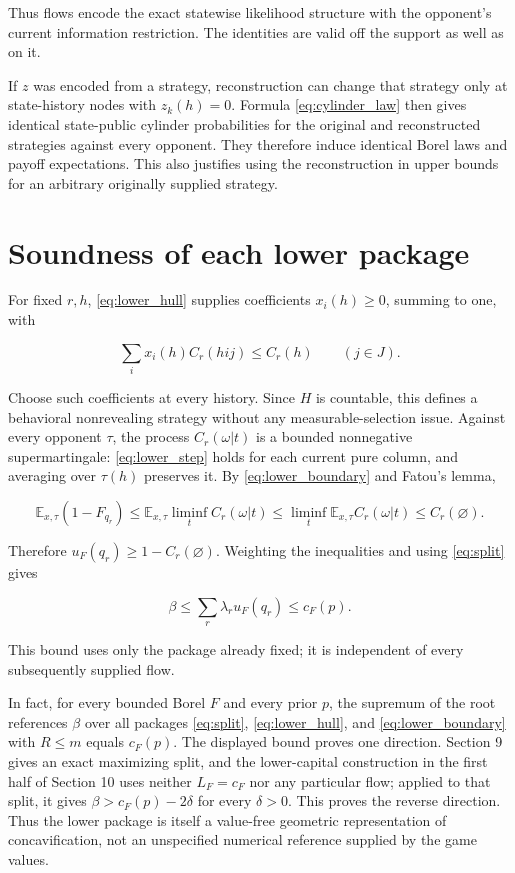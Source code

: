 \documentclass[11pt,a4paper]{article}
\begin{document}
Thus flows encode the exact statewise likelihood structure with the opponent's current information restriction. The identities are valid off the support as well as on it.

If \(z\) was encoded from a strategy, reconstruction can change that strategy only at state-history nodes with \(z_k(h)=0\). Formula \eqref{eq:cylinder_law} then gives identical state-public cylinder probabilities for the original and reconstructed strategies against every opponent. They therefore induce identical Borel laws and payoff expectations. This also justifies using the reconstruction in upper bounds for an arbitrary originally supplied strategy.

\section{Soundness of each lower package}

For fixed \(r,h\), \eqref{eq:lower_hull} supplies coefficients \(x_i(h)\ge0\), summing to one, with

\begin{equation}
\sum_i x_i(h)C_r(hij)\le C_r(h)\qquad(j\in J). \label{eq:lower_step}
\end{equation}

Choose such coefficients at every history. Since \(H\) is countable, this defines a behavioral nonrevealing strategy without any measurable-selection issue. Against every opponent \(\tau\), the process \(C_r(\omega|t)\) is a bounded nonnegative supermartingale: \eqref{eq:lower_step} holds for each current pure column, and averaging over \(\tau(h)\) preserves it. By \eqref{eq:lower_boundary} and Fatou's lemma,

\[
\mathbb E_{x,\tau}(1-F_{q_r})
\le\mathbb E_{x,\tau}\liminf_t C_r(\omega|t)
\le\liminf_t\mathbb E_{x,\tau}C_r(\omega|t)
\le C_r(\varnothing).
\]

Therefore \(u_F(q_r)\ge1-C_r(\varnothing)\). Weighting the inequalities and using \eqref{eq:split} gives

\begin{equation}
\beta\le\sum_r\lambda_r u_F(q_r)\le c_F(p). \label{eq:reference_bound}
\end{equation}

This bound uses only the package already fixed; it is independent of every subsequently supplied flow.

In fact, for every bounded Borel \(F\) and every prior \(p\), the supremum of the root references \(\beta\) over all packages \eqref{eq:split}, \eqref{eq:lower_hull}, and \eqref{eq:lower_boundary} with \(R\le m\) equals \(c_F(p)\). The displayed bound proves one direction. Section 9 gives an exact maximizing split, and the lower-capital construction in the first half of Section 10 uses neither \(L_F=c_F\) nor any particular flow; applied to that split, it gives \(\beta>c_F(p)-2\delta\) for every \(\delta>0\). This proves the reverse direction. Thus the lower package is itself a value-free geometric representation of concavification, not an unspecified numerical reference supplied by the game values.
\end{document}
